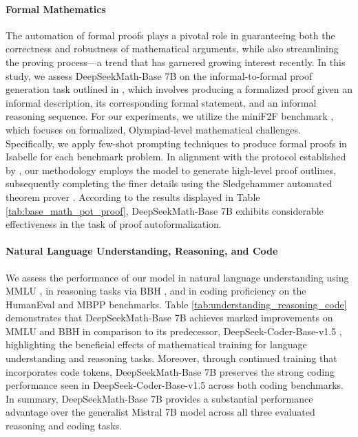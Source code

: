 \begin{itemize}[topsep=0pt]
\paragraph{Formal Mathematics}

The automation of formal proofs plays a pivotal role in guaranteeing both the correctness and robustness of mathematical arguments, while also streamlining the proving process—a trend that has garnered growing interest recently. In this study, we assess DeepSeekMath-Base 7B on the informal-to-formal proof generation task outlined in \citep{dsp_proof}, which involves producing a formalized proof given an informal description, its corresponding formal statement, and an informal reasoning sequence. For our experiments, we utilize the miniF2F benchmark \citep{minif2f}, which focuses on formalized, Olympiad-level mathematical challenges. Specifically, we apply few-shot prompting techniques to produce formal proofs in Isabelle for each benchmark problem. In alignment with the protocol established by \cite{dsp_proof}, our methodology employs the model to generate high-level proof outlines, subsequently completing the finer details using the Sledgehammer automated theorem prover \citep{sledgehammer}. According to the results displayed in Table \ref{tab:base_math_pot_proof}, DeepSeekMath-Base 7B exhibits considerable effectiveness in the task of proof autoformalization.

\paragraph{Natural Language Understanding, Reasoning, and Code}

We assess the performance of our model in natural language understanding using MMLU \citep{mmlu}, in reasoning tasks via BBH \citep{bbh}, and in coding proficiency on the HumanEval \citep{codex} and MBPP \citep{mbpp} benchmarks. Table \ref{tab:understanding_reasoning_code} demonstrates that DeepSeekMath-Base 7B achieves marked improvements on MMLU and BBH in comparison to its predecessor, DeepSeek-Coder-Base-v1.5 \citep{deepseek-coder}, highlighting the beneficial effects of mathematical training for language understanding and reasoning tasks. Moreover, through continued training that incorporates code tokens, DeepSeekMath-Base 7B preserves the strong coding performance seen in DeepSeek-Coder-Base-v1.5 across both coding benchmarks. In summary, DeepSeekMath-Base 7B provides a substantial performance advantage over the generalist Mistral 7B model \citep{mistral} across all three evaluated reasoning and coding tasks.


\end{itemize}
